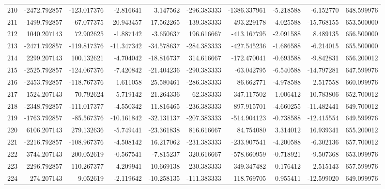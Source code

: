 \begin{tabular}{lrrrrrrrrr}
210 &  -2472.792857 &  -123.017376 &  -2.816641 &   3.147562 &  -296.383333 & -1386.337961 &  -5.218588 &  -6.152770 &  648.599976 \\
211 &  -1499.792857 &   -67.077375 &  20.943457 &  17.562265 &  -139.383333 &   493.229178 &  -4.025588 & -15.768155 &  653.500000 \\
212 &   1040.207143 &    72.902625 &  -1.887142 &  -3.650637 &   196.616667 &  -413.167795 &  -2.091588 &   8.489135 &  656.500000 \\
213 &  -2471.792857 &  -119.817376 & -11.347342 & -34.578637 &  -284.383333 &  -427.545236 &  -1.686588 &  -6.214015 &  655.500000 \\
214 &   2299.207143 &   100.132621 &  -4.704042 & -18.816737 &   314.616667 &  -172.470041 &  -0.693588 &  -9.842831 &  656.200012 \\
215 &  -2525.792857 &  -124.067376 &  -7.420842 & -21.404236 &  -290.383333 &   -63.042795 &  -6.540588 & -14.797281 &  647.599976 \\
216 &  -2453.792857 &  -118.767376 &   1.611058 &  25.580461 &  -286.383333 &    86.662771 &  -4.978588 &   2.517558 &  660.099976 \\
217 &   1524.207143 &    70.792624 &  -5.719142 & -21.264336 &   -62.383333 &  -347.117502 &   1.006412 & -10.783806 &  652.700012 \\
218 &  -2348.792857 &  -111.017377 &  -4.550342 &  11.816465 &  -236.383333 &   897.915701 &  -4.660255 & -11.482441 &  649.700012 \\
219 &  -1763.792857 &   -85.567376 & -10.161842 & -32.131137 &  -207.383333 &  -514.904123 &  -0.738588 & -12.415554 &  649.599976 \\
220 &   6106.207143 &   279.132636 &  -5.749441 & -23.361838 &   816.616667 &    84.754080 &   3.314012 &  16.939341 &  655.200012 \\
221 &  -2216.792857 &  -108.967376 &  -4.508142 &  16.217062 &  -231.383333 &  -233.907541 &  -4.200588 &  -6.302136 &  657.700012 \\
222 &   3744.207143 &   200.052619 &  -0.567541 &  -7.815237 &   320.616667 &  -578.660959 &  -0.718921 &  -9.507368 &  653.099976 \\
223 &  -2296.792857 &  -110.267377 &  -4.209941 & -10.669138 &  -230.383333 &  -349.347482 &   0.176412 &  -2.515143 &  657.599976 \\
224 &    274.207143 &     9.052619 &  -2.119642 & -10.258135 &  -111.383333 &   118.769705 &   0.955411 & -12.599020 &  649.099976 \\

\end{tabular}
